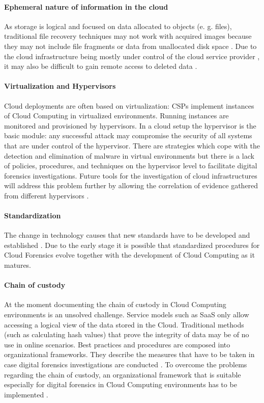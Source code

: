 \documentclass[runningheads,a4paper]{llncs}
\begin{document}
\paragraph{Ephemeral nature of information in the cloud} As storage is logical and focused on data allocated to objects (e. g. files), traditional file recovery techniques may not work with acquired images because they may not include file fragments or data from unallocated disk space \cite{Hegarty2011}. Due to the cloud infrastructure being mostly under control of the cloud service provider \cite{Chow2009}, it may also be difficult to gain remote access to deleted data \cite{Ruan2011}. 

\paragraph{Virtualization and Hypervisors} Cloud deployments are often based on virtualization: CSPs implement instances of Cloud Computing in virtualized environments. Running instances are monitored and provisioned by hypervisors. In a cloud setup the hypervisor is the basic module: any successful attack may compromise the security of all systems that are under control of the hypervisor. There are strategies which cope with the detection and elimination of malware in virtual environments but there is a lack of policies, procedures, and techniques on the hypervisor level to facilitate digital forensics investigations. Future tools for the investigation of cloud infrastructures will address this problem further by allowing the correlation of evidence gathered from different hypervisors \cite{Krishnan2010,Lempereur2010,Payne2007}. 

\paragraph{Standardization} The change in technology causes that new standards have to be developed and established \cite{Ruan2011}. Due to the early stage it is possible that standardized procedures for Cloud Forensics evolve together with the development of Cloud Computing as it matures. 

\paragraph{Chain of custody} At the moment documenting the chain of custody in Cloud Computing environments is an unsolved challenge. Service models such as SaaS only allow accessing a logical view of the data stored in the Cloud. Traditional methods (such as calculating hash values) that prove the integrity of data may be of no use in online scenarios. Best practices and procedures are composed into organizational frameworks. They describe the measures that have to be taken in case digital forensics investigations are conducted \cite{Grispos2011}. To overcome the problems regarding the chain of custody, an organizational framework that is suitable especially for digital forensics in Cloud Computing environments has to be implemented \cite{Cohen2010,Ke2011,Wang2010}. 
\end{document}
